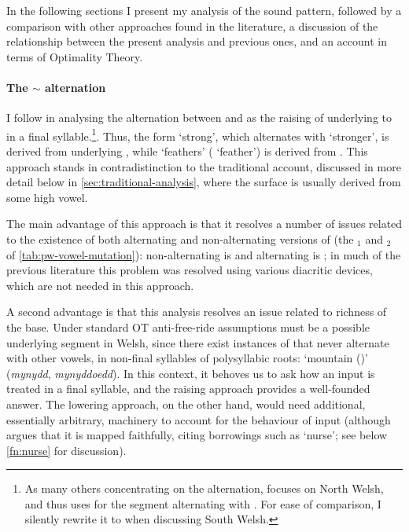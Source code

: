 In the following sections I present my analysis of the sound pattern, followed by a comparison with other approaches found in the literature, a discussion of the relationship between the present analysis and previous ones, and an account in terms of Optimality Theory.

\paragraph{The \ipa{[i]} $\sim$ \ipa{[ə]} alternation}
\label{sec:status-ipai-sim}

I follow \citet{hannahs07:_const_welsh} in analysing the alternation between \ipa{[ə]} and \ipa{[i]} as the raising of underlying  to \ipa{[i]} in a final syllable.\footnote{As many others concentrating on the alternation, \citet{hannahs07:_const_welsh} focuses on North Welsh, and thus uses \ipa{[ɨ]} for the segment alternating with \ipa{[ə]}. For ease of comparison, I silently rewrite it to \ipa{[i]} when discussing South Welsh.}. Thus, the form \ipa{[ˈkriːv]} `strong', which alternates with \ipa{[ˈkrəvaχ]} `stronger', is derived from underlying , while \ipa{[ˈpliːv]} `feathers' (\ipa{[ˈpliːvin]} `feather') is derived from . This approach stands in contradistinction to the traditional account, discussed in more detail below in \cref{sec:traditional-analysis}, where the surface \ipa{[ə]} is usually derived from some high vowel.

The main advantage of this approach is that it resolves a number of issues related to the existence of both alternating and non\hyp alternating versions of \ipa{[i]} (the $_{1}$ and $_{2}$ of \cref{tab:pw-vowel-mutation}): non\hyp alternating \ipa{[i]} is  and alternating \ipa{[i]} is ;  in much of the previous literature this problem was resolved using various diacritic devices, which are not needed in this approach.

A second advantage is that this analysis resolves an issue related to richness of the base. Under standard OT anti\hyp free\hyp ride assumptions  \ipa{[ə]} must be a possible underlying segment in Welsh, since there exist instances of \ipa{[ə]} that never alternate with other vowels, \eg in non-final syllables of polysyllabic roots: \alternation{[ˈməni]}{[məˈnəðe]} `mountain ()' (\emph{mynydd}, \emph{mynyddoedd}). In this context, it behoves us to ask how an input  is treated in a final syllable, and the raising approach provides a well\hyp founded answer. The lowering approach, on the other hand, would need additional, essentially arbitrary, machinery to account for the behaviour of input  (although \cite{greenbook} argues that it is mapped faithfully, citing borrowings such as \ipa{[ˈnərs]} `nurse'; see below \cref{fn:nurse} for discussion).


